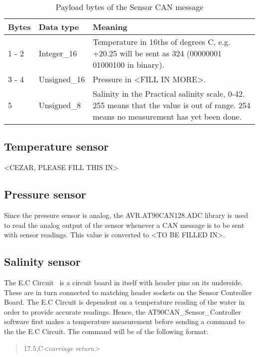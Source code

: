\begin{table*}
\centering
    \caption{Payload bytes of the Sensor CAN message}
    \begin{tabular}{|l|l|p{11cm}|} \hline
    \label{table:SensorMessage}
    	\textbf{Bytes} & \textbf{Data type} & \textbf{Meaning} \\ \hline
        1 - 2 & Integer\_16 & Temperature in 16ths of degrees C, e.g. +20.25 will be sent as 324 \newline 
        (00000001 01000100 in binary). \\ \hline
        3 - 4 & Unsigned\_16 & Pressure in <FILL IN MORE>. \\ \hline
        5  & Unsigned\_8 & Salinity in the Practical salinity scale, 0-42. 255 means that the value is out of range. 254 means no measurement has yet been done. \\ \hline
    \end{tabular}
\end{table*}

\subsection{Temperature sensor}
<CEZAR, PLEASE FILL THIS IN>

\subsection{Pressure sensor}
Since the pressure sensor is analog, the AVR.AT90CAN128.ADC library is used to read the analog output of the sensor whenever a CAN message is to be sent with sensor readings. This value is converted to <TO BE FILLED IN>.


\subsection{Salinity sensor}
The E.C Circuit~\cite{web:ec_circuit} is a circuit board in itself with header pins on its underside. These are in turn connected to matching  header sockets on the Sensor Controller Board. \newline
The E.C Circuit is dependent on a temperature reading of the water in order to provide accurate readings. Hence, the AT90CAN\_Sensor\_Controller software first makes a temperature measurement before sending a command to the the E.C Circuit. The command will be of the following format:

\begin{quote}
17.5,C\emph{<carriage return>}
\end{quote}

